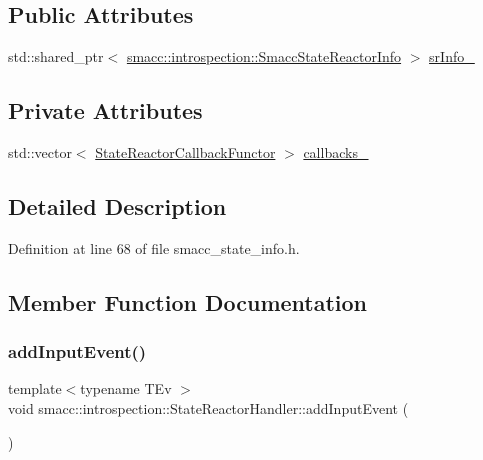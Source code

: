 \subsection*{Public Attributes}
\begin{DoxyCompactItemize}
\item 
std\+::shared\+\_\+ptr$<$ \hyperlink{structsmacc_1_1introspection_1_1SmaccStateReactorInfo}{smacc\+::introspection\+::\+Smacc\+State\+Reactor\+Info} $>$ \hyperlink{classsmacc_1_1introspection_1_1StateReactorHandler_a30bb48cbd4712aff2683c21b85ef3e8e}{sr\+Info\+\_\+}
\end{DoxyCompactItemize}
\subsection*{Private Attributes}
\begin{DoxyCompactItemize}
\item 
std\+::vector$<$ \hyperlink{structsmacc_1_1introspection_1_1StateReactorCallbackFunctor}{State\+Reactor\+Callback\+Functor} $>$ \hyperlink{classsmacc_1_1introspection_1_1StateReactorHandler_a292b02da51dca6fa9eb1c47a78340a19}{callbacks\+\_\+}
\end{DoxyCompactItemize}


\subsection{Detailed Description}


Definition at line 68 of file smacc\+\_\+state\+\_\+info.\+h.



\subsection{Member Function Documentation}
\mbox{\label{classsmacc_1_1introspection_1_1StateReactorHandler_aef392b9521dc4484ef84082844cd3538}} 
\subsubsection{\texorpdfstring{add\+Input\+Event()}{addInputEvent()}}
{\footnotesize\ttfamily template$<$typename T\+Ev $>$ \\
void smacc\+::introspection\+::\+State\+Reactor\+Handler\+::add\+Input\+Event (\begin{DoxyParamCaption}{ }\end{DoxyParamCaption})}



